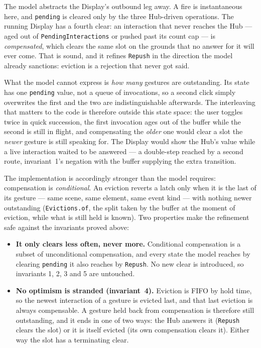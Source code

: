 \documentclass[a4paper,10pt,fleqn]{article}
\begin{document}
The model abstracts the Display's outbound leg away.  A fire is instantaneous
here, and \texttt{pending} is cleared only by the three Hub-driven operations.
The running Display has a fourth clear: an interaction that never reaches the
Hub --- aged out of \texttt{PendingInteractions} or pushed past its count cap
--- is \emph{compensated}, which clears the same slot on the grounds that no
answer for it will ever come.  That is sound, and it refines \texttt{Repush} in
the direction the model already sanctions: eviction is a rejection that never
got said.

What the model cannot express is \emph{how many} gestures are outstanding.  Its
state has one \texttt{pending} value, not a queue of invocations, so a second
click simply overwrites the first and the two are indistinguishable afterwards.
The interleaving that matters to the code is therefore outside this state space:
the user toggles twice in quick succession, the first invocation ages out of the
buffer while the second is still in flight, and compensating the \emph{older}
one would clear a slot the \emph{newer} gesture is still speaking for.  The
Display would show the Hub's value while a live interaction waited to be
answered --- a double-step reached by a second route, invariant~1's negation
with the buffer supplying the extra transition.

The implementation is accordingly stronger than the model requires:
compensation is \emph{conditional}.  An eviction reverts a latch only when it is
the last of its gesture --- same scene, same element, same event kind --- with
nothing newer outstanding (\texttt{Evictions.of}, the split taken by the buffer
at the moment of eviction, while what is still held is known).  Two properties
make the refinement safe against the invariants proved above:

\begin{itemize}
  \item \textbf{It only clears less often, never more.}  Conditional
    compensation is a subset of unconditional compensation, and every state the
    model reaches by clearing \texttt{pending} it also reaches by
    \texttt{Repush}.  No new clear is introduced, so invariants 1, 2, 3 and 5
    are untouched.
  \item \textbf{No optimism is stranded (invariant~4).}  Eviction is FIFO by
    hold time, so the newest interaction of a gesture is evicted last, and that
    last eviction is always compensable.  A gesture held back from compensation
    is therefore still outstanding, and it ends in one of two ways: the Hub
    answers it (\texttt{Repush} clears the slot) or it is itself evicted (its
    own compensation clears it).  Either way the slot has a terminating clear.
\end{itemize}
\end{document}
